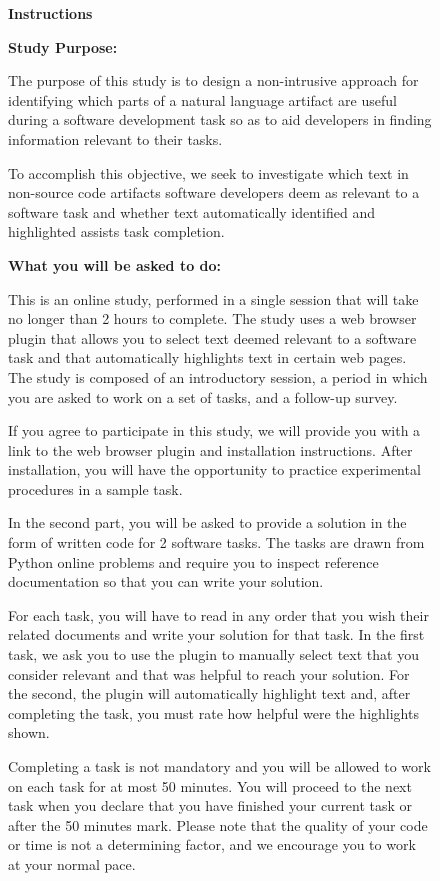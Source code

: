 

\begin{figure}
\begin{mdframed}[backgroundcolor=gray!05] 
\begin{footnotesize}

{\large \textbf{Instructions}} \bigskip


\textbf{Study Purpose:} \medskip

The purpose of this study is to design a non-intrusive approach for identifying which parts of a natural language artifact are useful during a software development task so as to aid developers in finding information relevant to their tasks.

To accomplish this objective, we seek to investigate which text in non-source code artifacts software developers deem as relevant to a software task and whether text automatically identified and highlighted assists task completion.
 \medskip

\textbf{What you will be asked to do:} \medskip


This  is an online study, performed in a single session that will take no longer than 2 hours to complete. The study uses a web browser plugin that allows you to select text deemed relevant to a software task and that automatically highlights text in certain web pages. The study is composed of an introductory session, a period in which you are asked to work on a set of tasks, and a follow-up survey.  \medskip

If you agree to participate in this study, we will provide you with a link to the web browser plugin and installation instructions. After installation, you will have the opportunity to practice experimental procedures in a sample task. \medskip

In the second part, you will be asked to provide a solution in the form of written code for 2 software tasks. The tasks are drawn from Python online problems and require you to inspect reference documentation so that you can write your solution.  \medskip

For each task, you will have to read in any order that you wish their related documents and write your solution for that task. In the first task, we ask you to use the plugin to manually select text that you consider relevant and that was helpful to reach your solution. For the second, the plugin will automatically highlight text and, after completing the task, you must rate how helpful were the highlights shown.  \medskip

Completing a task is not mandatory and you will be allowed to work on each task for at most 50 minutes. You will proceed to the next task when you declare that you have finished your current task or after the 50 minutes mark. Please note that the quality of your code or time is not a determining factor, and we encourage you to work at your normal pace.  \medskip


\end{footnotesize}
\end{mdframed}
\end{figure}
